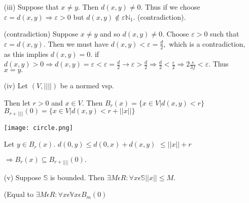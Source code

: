 \documentclass{article}
\theoremstyle{definition}
\numberwithin{equation}{section}
\begin{document}
\begin{itemize}
    \item[(iii)] Suppose that $x \neq y.$ Then $d(x,y) \neq 0.$ Thus if we choose $\varepsilon = d(x,y) \Rightarrow \varepsilon > 0$ but $d(x,y) \notin \varepsilon \mathbb{N}_1$. (contradiction).
    \item[(contradiction)] Suppose $x \neq y$ and so $d(x,y) \neq 0.$ Choose $\varepsilon > 0$ such that $\varepsilon = d(x,y).$ Then we must have
    $
    d(x,y) < \varepsilon = \frac{d}{2}, 
    $
    which is a contradiction, as this implies $d(x,y) = 0.$ if $d(x,y) > 0 \Rightarrow d(x,y) = \varepsilon < \varepsilon = \frac{d}{2} \rightarrow \varepsilon > \frac{d}{2} \Rightarrow \frac{d}{2}< \frac{\varepsilon}{2} \Rightarrow 2 \frac{s}{3f}< \varepsilon$. Thus $x =y.$

    \item[(iv)] Let $(V,|| ||)$ be a normed vsp.

    Then let $r > 0$ and $x \in V.$ Then
    $
    B_{r}(x) = \{ x \in V | d(x,y) < r \} 
    $
    $
    B_{r + || ||}(0)=\{ x \in V| d(x,y) < r + || x || \}
    $

    \begin{center}
        \texttt{[image: circle.png]}
    \end{center}

    Let $y \in B_{r}(x).$ 
    $
    d(0,y) \leq d(0,x)+d(x,y)
    $
    $
    \leq || x || + r
    $

    $
    \Rightarrow B_{r}(x) \subseteq B_{r + || ||}(0).
    $

    \item[(v)] Suppose $\mathbb{S}$ is bounded. Then $\exists M \epsilon R: \forall x \epsilon \mathbb{S} || x || \leq M.$

    (Equal to $\exists M \epsilon R: \forall x \epsilon \mathbb{V} x \epsilon B_{m}(0)$
\end{itemize}
\end{document}
